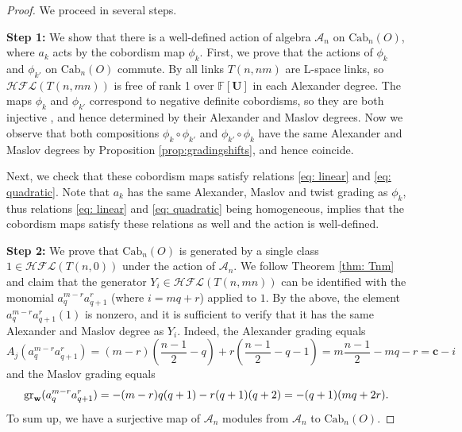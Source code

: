 \documentclass{amsart}
\newcommand{\CA}{\mathcal{A}}
\newcommand{\Cab}{\mathrm{Cab}}
\newcommand{\F}{\mathbb{F}}
\newcommand{\cHFL}{\mathcal{H\!F\! L}}
\newcommand{\w}{\mathbf{w}}
\def\gr{\textup{gr}}
\def\w{{\bf{w}}}
\newcommand{\UU}{\mathbf{U}}
\renewcommand{\AA}[1]{{\color{blue}#1}}
\newcommand{\cc}{\mathbf{c}}
\begin{document}
\begin{proof}
We proceed in several steps.

{\bf Step 1:} We show that there is a well-defined action of algebra $\CA_n$ on $\Cab_n(O)$, where $a_k$ acts by the cobordism map $\phi_k$. First, we prove that the actions of $\phi_{k}$ and $\phi_{k'}$ on $\Cab_n(O)$ commute. By \cite{GH} all links $T(n,nm)$ are L-space links, so $\cHFL(T(n,mn))$ is free of rank 1 over $\F[\UU]$ in each Alexander degree. The maps $\phi_{k}$ and $\phi_{k'}$ correspond to negative definite cobordisms, so they are both injective \cite{AGL}, and hence determined by their Alexander and Maslov degrees. Now we observe that both compositions $\phi_{k}\circ \phi_{k'}$ and $\phi_{k'}\circ \phi_{k}$
have the same Alexander and Maslov degrees by Proposition \ref{prop:gradingshifts}, and hence coincide.

Next, we check that these cobordism maps satisfy  relations \eqref{eq: linear} and \eqref{eq: quadratic}. Note that $a_k$ has the same Alexander, Maslov and twist grading as $\phi_k$, thus relations \eqref{eq: linear} and \eqref{eq: quadratic} being homogeneous, implies that the cobordism maps satisfy  these relations as well and the action is well-defined. 




{\bf Step 2:} We prove that $\Cab_n(O)$ is generated by a single class $1\in \cHFL(T(n,0))$ under the action of $\CA_n$. 
We follow Theorem \ref{thm: Tnm} and claim that the generator $Y_i\in \cHFL(T(n,mn))$ can be identified with the monomial $a_{q}^{m-r}a_{q+1}^{r}$ (where $i=mq+r$) applied to $1$.
By the above, the element $a_{q}^{m-r}a_{q+1}^{r}(1)$ is nonzero, and it is sufficient to verify that it has the same Alexander and Maslov degree as $Y_i$. Indeed, the Alexander grading equals
$$
A_j(a_{q}^{m-r}a_{q+1}^{r})=(m-r)\left(\frac{n-1}{2}-q\right)+r\left(\frac{n-1}{2}-q-1\right)=m\frac{n-1}{2}-mq-r=\cc-i
$$
and the Maslov grading equals
$$
\gr_{\w}(a_{q}^{m-r}a_{q+1}^{r})=-(m-r)q(q+1)-r(q+1)(q+2)=-(q+1)(mq+2r).
$$
To sum up, we have a surjective map of $\CA_n$ modules from $\CA_n$ to $\Cab_n(O)$.


\end{proof}
\end{document}
